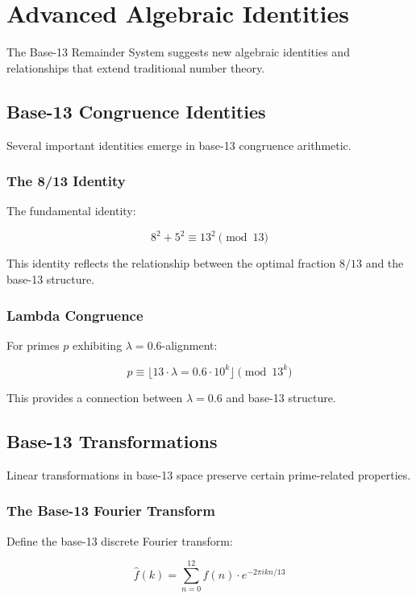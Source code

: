 \documentclass[12pt,a4paper]{report}
\newcommand{\lambdaval}{\lambda = 0.6}
\begin{document}
\chapter{Advanced Algebraic Identities}

The Base-13 Remainder System suggests new algebraic identities and relationships that extend traditional number theory.

\section{Base-13 Congruence Identities}

Several important identities emerge in base-13 congruence arithmetic.

\subsection{The 8/13 Identity}

The fundamental identity:

\[
8^2 + 5^2 \equiv 13^2 \pmod{13}
\]

This identity reflects the relationship between the optimal fraction $8/13$ and the base-13 structure.

\subsection{Lambda Congruence}

For primes $p$ exhibiting $\lambdaval$-alignment:

\[
p \equiv \lfloor 13 \cdot \lambdaval \cdot 10^k \rfloor \pmod{13^k}
\]

This provides a connection between $\lambdaval$ and base-13 structure.

\section{Base-13 Transformations}

Linear transformations in base-13 space preserve certain prime-related properties.

\subsection{The Base-13 Fourier Transform}

Define the base-13 discrete Fourier transform:

\[
\hat{f}(k) = \sum_{n=0}^{12} f(n) \cdot e^{-2\pi i kn/13}
\]
\end{document}
